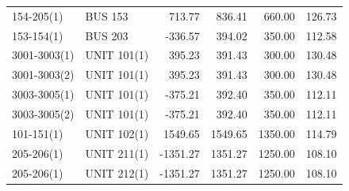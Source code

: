 \documentclass[10pt]{report}
\begin{document}
\begin{table}[H]
{\begin{tabular}{llrrrr}
154-205(1) & BUS 153 & 713.77 & 836.41 & 660.00 & 126.73 \\
153-154(1) & BUS 203 & -336.57 & 394.02 & 350.00 & 112.58 \\
3001-3003(1) & UNIT 101(1) & 395.23 & 391.43 & 300.00 & 130.48 \\
3001-3003(2) & UNIT 101(1) & 395.23 & 391.43 & 300.00 & 130.48 \\
3003-3005(1) & UNIT 101(1) & -375.21 & 392.40 & 350.00 & 112.11 \\
3003-3005(2) & UNIT 101(1) & -375.21 & 392.40 & 350.00 & 112.11 \\
101-151(1) & UNIT 102(1) & 1549.65 & 1549.65 & 1350.00 & 114.79 \\
205-206(1) & UNIT 211(1) & -1351.27 & 1351.27 & 1250.00 & 108.10 \\
205-206(1) & UNIT 212(1) & -1351.27 & 1351.27 & 1250.00 & 108.10 \\
\bottomrule
\end{tabular}}
\end{table}
\end{document}
